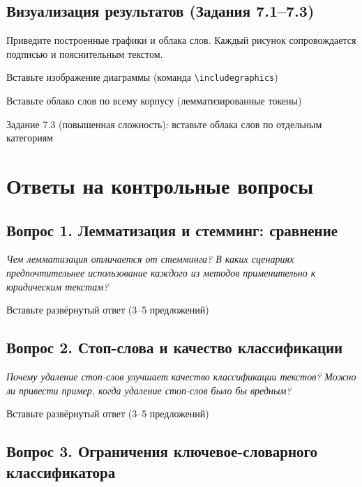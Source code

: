 \documentclass[12pt, a4paper]{report}
\newcommand{\placeholder}[2][Вставьте результат]{%
  \begin{tcolorbox}[placeholderbox, title={#2}]
    #1
  \end{tcolorbox}%
  \vspace{4pt}%
}
\begin{document}
\section{Визуализация результатов (Задания 7.1–7.3)}

Приведите построенные графики и облака слов. Каждый рисунок сопровождается
подписью и пояснительным текстом.

\placeholder[Вставьте изображение диаграммы (команда \texttt{\textbackslash includegraphics})]{Рис.~1. Диаграмма распределения документов по категориям}

\placeholder[Вставьте облако слов по всему корпусу (лемматизированные токены)]{Рис.~2. Облако слов по всему корпусу}

\placeholder[Задание 7.3 (повышенная сложность): вставьте облака слов по отдельным категориям]{Рис.~3–6. Облака слов по категориям}

\chapter{Ответы на контрольные вопросы}

\section{Вопрос 1. Лемматизация и стемминг: сравнение}

\textit{Чем лемматизация отличается от стемминга? В каких сценариях предпочтительнее
использование каждого из методов применительно к юридическим текстам?}

\placeholder[Вставьте развёрнутый ответ (3–5 предложений)]{Ответ на вопрос 1}

\section{Вопрос 2. Стоп-слова и качество классификации}

\textit{Почему удаление стоп-слов улучшает качество классификации текстов? Можно
ли привести пример, когда удаление стоп-слов было бы вредным?}

\placeholder[Вставьте развёрнутый ответ (3–5 предложений)]{Ответ на вопрос 2}

\section{Вопрос 3. Ограничения ключевое-словарного классификатора}
\end{document}
